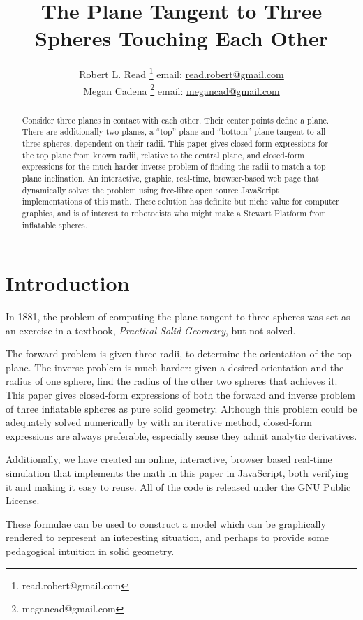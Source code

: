 \documentclass{article}
\title{The Plane Tangent to Three Spheres Touching Each Other}
\author{Robert L. Read
  \thanks{read.robert@gmail.com}
  email: \href{mailto:read.robert@gmail.com}{read.robert@gmail.com}\\
Megan Cadena
  \thanks{megancad@gmail.com}
  email: \href{mailto:megancad@gmail.com}{megancad@gmail.com}
  }
\begin{document}
\maketitle

\begin{abstract}
  Consider three planes in contact with each other. Their center points
  define a plane. There are additionally two planes, a ``top'' plane and ``bottom'' plane
  tangent to all three spheres, dependent on their radii.
  This paper gives closed-form expressions for the top plane from known radii,
  relative to the central plane,
  and closed-form expressions for
  the much harder inverse problem of finding the radii to match a top plane inclination.
  An interactive, graphic, real-time,
  browser-based web page that dynamically solves the problem\cite{softrobotcalc}
  using free-libre open source JavaScript implementations of this math.
  These solution has definite but niche value for computer graphics, and is of interest
  to robotocists who might make a Stewart Platform from inflatable spheres.
\end{abstract}


\section{Introduction}

In 1881, the problem of computing the plane tangent to three spheres was
set as an exercise in a textbook, {\em Practical Solid Geometry}\cite{payne1881},
but not solved.

The forward problem is given three radii,
to determine the orientation of the top plane.
The inverse problem is much harder: given a desired orientation and the radius of one
sphere, find the radius of the other two spheres that achieves it.
This paper gives closed-form expressions of both
the forward and inverse problem of three inflatable spheres as pure solid geometry.
Although this problem could be adequately solved numerically by with an iterative method,
closed-form expressions are always preferable, especially sense they admit analytic derivatives.

Additionally, we have created an online, interactive, browser based real-time simulation\cite{softrobotcalc} that implements
the math in this paper in JavaScript, both verifying it and making it easy to reuse.
All of the code is released under the GNU Public License\cite{AGPL3}.


These formulae can be used to construct a model which can be graphically rendered to represent an interesting
situation, and perhaps to provide some pedagogical intuition in solid geometry.
\end{document}

